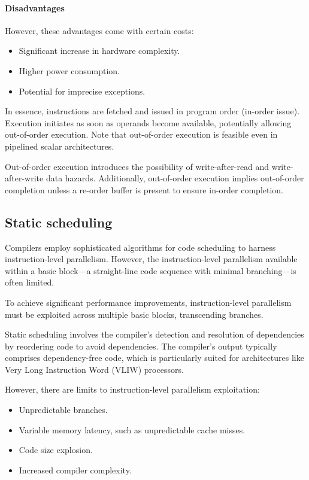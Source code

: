 \paragraph*{Disadvantages}
However, these advantages come with certain costs:
\begin{itemize}
    \item Significant increase in hardware complexity.
    \item Higher power consumption.
    \item Potential for imprecise exceptions.
\end{itemize}
In essence, instructions are fetched and issued in program order (in-order issue). 
Execution initiates as soon as operands become available, potentially allowing out-of-order execution. 
Note that out-of-order execution is feasible even in pipelined scalar architectures.

Out-of-order execution introduces the possibility of write-after-read and write-after-write data hazards. 
Additionally, out-of-order execution implies out-of-order completion unless a re-order buffer is present to ensure in-order completion.

\subsection{Static scheduling}
Compilers employ sophisticated algorithms for code scheduling to harness instruction-level parallelism.
However, the instruction-level parallelism available within a basic block—a straight-line code sequence with minimal branching—is often limited. 

To achieve significant performance improvements, instruction-level parallelism must be exploited across multiple basic blocks, transcending branches.

Static scheduling involves the compiler's detection and resolution of dependencies by reordering code to avoid dependencies. 
The compiler's output typically comprises dependency-free code, which is particularly suited for architectures like Very Long Instruction Word (VLIW) processors.

However, there are limits to instruction-level parallelism exploitation:
\begin{itemize}
    \item Unpredictable branches.
    \item Variable memory latency, such as unpredictable cache misses.
    \item Code size explosion.
    \item Increased compiler complexity.
\end{itemize}